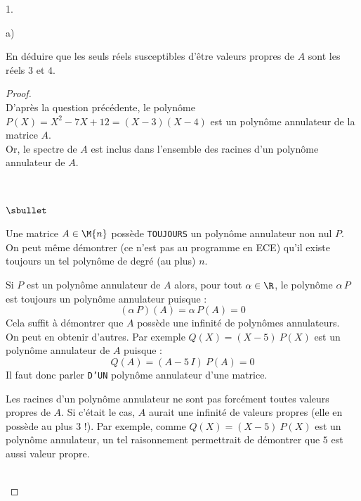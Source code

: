 \documentclass[11pt]{article}%
\begin{document}
\begin{noliste}{1.}
\begin{noliste}{a)}
  \item En déduire que les seuls réels susceptibles d'être valeurs
    propres de $A$ sont les réels $3$ et $4$.

    \begin{proof}~\\%
      D'après la question précédente, le polynôme $P(X) = X^2 - 7X +
      12 = (X-3)(X-4)$ est un polynôme annulateur de la matrice
      $A$.\\
      Or, le spectre de $A$ est inclus dans l'ensemble des racines
      d'un polynôme annulateur de $A$.%
      \begin{remark}~%
        \begin{noliste}{$\sbullet$}
        \item Une matrice $A \in \M{n}$ possède {\tt TOUJOURS} un
          polynôme annulateur non nul $P$.\\
          On peut même démontrer (ce n'est pas au programme en ECE)
          qu'il existe toujours un tel polynôme de degré (au plus)
          $n$.
          
        \item Si $P$ est un polynôme annulateur de $A$ alors, pour
          tout $\alpha \in \R$, le polynôme $\alpha \, P$ est toujours
          un polynôme annulateur puisque :
          \[
          (\alpha \, P)(A) = \alpha \, P(A) = 0
          \]
          Cela suffit à démontrer que $A$ possède une infinité de
          polynômes annulateurs. \\
          On peut en obtenir d'autres. Par exemple $Q(X) = (X-5) \
          P(X)$ est un polynôme annulateur de $A$ puisque :
          \[
          Q(A) = (A - 5 \, I) \ P(A) = 0
          \]
          Il faut donc parler {\tt D'UN} polynôme annulateur d'une
          matrice.
          
        \item Les racines d'un polynôme annulateur ne sont pas forcément
          toutes valeurs propres de $A$. Si c'était le cas, $A$ aurait
          une infinité de valeurs propres (elle en possède au plus $3$
          !). Par exemple, comme $Q(X) = (X-5) \ P(X)$ est un polynôme
          annulateur, un tel raisonnement permettrait de démontrer que
          $5$ est aussi valeur propre.
          
        \end{noliste}
      \end{remark}~\\[-1.4cm]
    \end{proof}



\end{noliste}
\end{noliste}
\end{document}
